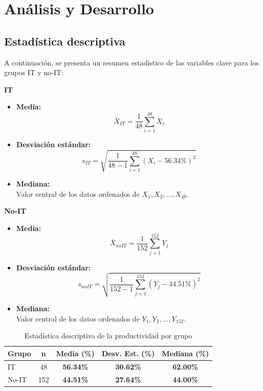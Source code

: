\section{Análisis y Desarrollo}

\subsection{Estadística descriptiva}

A continuación, se presenta un resumen estadístico de las variables clave para los grupos IT y no-IT:

\begin{multicols}{2}
\textbf{IT}
\begin{itemize}
    \item \textbf{Media:}
    \[
        \bar{X}_{IT} = \frac{1}{48} \sum_{i=1}^{48} X_{i}
    \]
    \item \textbf{Desviación estándar:}
    \[
        s_{IT} = \sqrt{\frac{1}{48-1} \sum_{i=1}^{48} (X_{i} - 56.34\%)^2}
    \]
    \item \textbf{Mediana:} \\
    Valor central de los datos ordenados de $X_{1}, X_{2}, ..., X_{48}$.
\end{itemize}

\columnbreak

\textbf{No-IT}
\begin{itemize}
    \item \textbf{Media:}
    \[
        \bar{X}_{noIT} = \frac{1}{152} \sum_{j=1}^{152} Y_{j}
    \]
    \item \textbf{Desviación estándar:}
    \[
        s_{noIT} = \sqrt{\frac{1}{152-1} \sum_{j=1}^{152} (Y_{j} - 44.51\%)^2}
    \]
    \item \textbf{Mediana:} \\
    Valor central de los datos ordenados de $Y_{1}, Y_{2}, ..., Y_{152}$.
\end{itemize}
\end{multicols}

\begin{table}[H]
\centering
\begin{tabular}{|l|c|c|c|c|}
\hline
\textbf{Grupo} & \textbf{n} & \textbf{Media (\%)} & \textbf{Desv. Est. (\%)} & \textbf{Mediana (\%)} \\
\hline
IT & 48 & \textbf{56.34\%} & \textbf{30.62\%} & \textbf{62.00\%} \\
No-IT & 152 & \textbf{44.51\%} & \textbf{27.64\%} & \textbf{44.00\%} \\
\hline
\end{tabular}
\caption{Estadística descriptiva de la productividad por grupo}
\end{table}

